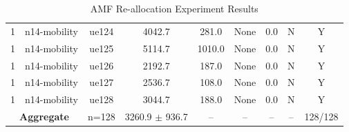 \begin{table}[ht]
\begin{tabular}{|c|c|c|c|c|c|c|c|c|}
1 & n14-mobility & ue124 & 4042.7 & 281.0 & None & 0.0 & N & Y \\
1 & n14-mobility & ue125 & 5114.7 & 1010.0 & None & 0.0 & N & Y \\
1 & n14-mobility & ue126 & 2192.7 & 187.0 & None & 0.0 & N & Y \\
1 & n14-mobility & ue127 & 2536.7 & 108.0 & None & 0.0 & N & Y \\
1 & n14-mobility & ue128 & 3044.7 & 188.0 & None & 0.0 & N & Y \\
\multicolumn{2}{|c|}{\textbf{Aggregate}} & n=128 & 3260.9 $\pm$ 936.7 & -- & -- & -- & -- & 128/128 \\
\hline
\end{tabular}
\caption{AMF Re-allocation Experiment Results}
\label{tab:amf_realloc}
\end{table}
